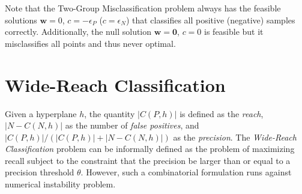 \documentclass[11pt]{article}
\theoremstyle{definition}
\newcommand{\vect}[1]{\mathbf{#1}}
\begin{document}
Note that the Two-Group Misclassification problem always has the feasible
solutions $\vect{w} = 0$, $c = - \epsilon_P$ ($c = \epsilon_N$)
that classifies all positive (negative) samples correctly.
Additionally, the null solution $\vect{w} = \vect{0}$, $c = 0$ is feasible but 
it misclassifies all points and thus never optimal.


\section{Wide-Reach Classification}
Given a hyperplane $h$, the quantity $|C(P, h)|$ is defined as the {\em reach\/},
$|N - C(N,h)|$ as the number of {\em false positives\/},
and $|C(P,h)| / (|C(P,h)| + |N - C(N,h)|)$ as the {\em precision\/}.
The {\em Wide-Reach Classification\/} problem can be informally defined
as the problem of maximizing recall subject to the constraint that the precision
be larger than or equal to a precision threshold $\theta$.
However, such a combinatorial formulation runs against numerical instability problem. 




\end{document}
